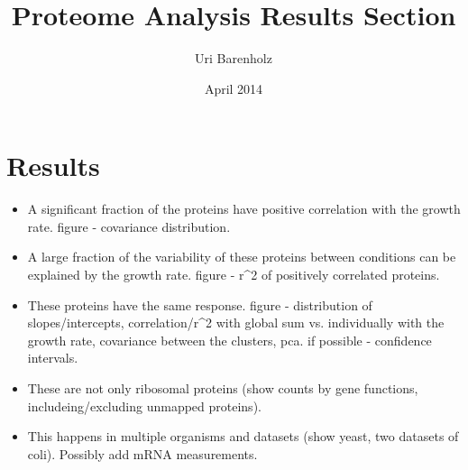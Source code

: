 \documentclass[a4page,notitlepage]{article}
\title{Proteome Analysis Results Section}
\author{Uri Barenholz}
\date{April 2014}
\begin{document}
\maketitle
\section{Results}
\begin{itemize}
\item 
A significant fraction of the proteins have positive correlation with the growth rate.
figure - covariance distribution.
\item A large fraction of the variability of these proteins between conditions can be explained by the growth rate.
figure - r^2 of positively correlated proteins.
\item These proteins have the same response.
figure - distribution of slopes/intercepts, correlation/r^2 with global sum vs. individually with the growth rate, covariance between the clusters, pca. if possible - confidence intervals.
\item These are not only ribosomal proteins (show counts by gene functions, includeing/excluding unmapped proteins).
\item This happens in multiple organisms and datasets (show yeast, two datasets of coli). Possibly add mRNA measurements.
\end{itemize}
\end{document}
